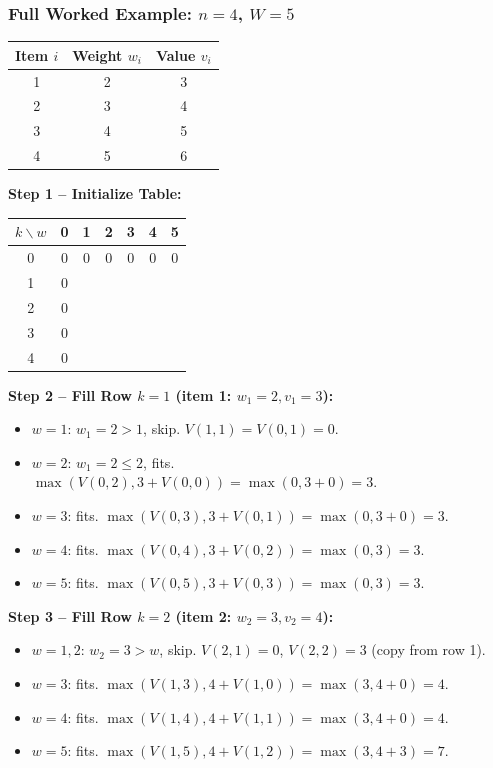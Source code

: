 \documentclass[12pt,portrait]{article}
\begin{document}
\subsubsection{Full Worked Example: $n=4$, $W=5$}

\begin{center}
\begin{tabular}{c|c|c}
\toprule
\textbf{Item $i$} & \textbf{Weight $w_i$} & \textbf{Value $v_i$} \\
\midrule
1 & 2 & 3 \\
2 & 3 & 4 \\
3 & 4 & 5 \\
4 & 5 & 6 \\
\bottomrule
\end{tabular}
\end{center}

\textbf{Step 1 -- Initialize Table:}

\begin{center}
\begin{tabular}{c|c|c|c|c|c|c}
\toprule
$k \backslash w$ & 0 & 1 & 2 & 3 & 4 & 5 \\
\midrule
0 & 0 & 0 & 0 & 0 & 0 & 0 \\
1 & 0 & & & & & \\
2 & 0 & & & & & \\
3 & 0 & & & & & \\
4 & 0 & & & & & \\
\bottomrule
\end{tabular}
\end{center}

\textbf{Step 2 -- Fill Row $k=1$ (item 1: $w_1=2, v_1=3$):}
\begin{itemize}[leftmargin=*]
    \item $w=1$: $w_1=2 > 1$, skip. $V(1,1) = V(0,1) = 0$.
    \item $w=2$: $w_1=2 \leq 2$, fits. $\max(V(0,2), 3+V(0,0)) = \max(0, 3+0) = 3$.
    \item $w=3$: fits. $\max(V(0,3), 3+V(0,1)) = \max(0, 3+0) = 3$.
    \item $w=4$: fits. $\max(V(0,4), 3+V(0,2)) = \max(0, 3) = 3$.
    \item $w=5$: fits. $\max(V(0,5), 3+V(0,3)) = \max(0, 3) = 3$.
\end{itemize}

\textbf{Step 3 -- Fill Row $k=2$ (item 2: $w_2=3, v_2=4$):}
\begin{itemize}[leftmargin=*]
    \item $w=1,2$: $w_2=3 > w$, skip. $V(2,1)=0$, $V(2,2)=3$ (copy from row 1).
    \item $w=3$: fits. $\max(V(1,3), 4+V(1,0)) = \max(3, 4+0) = 4$.
    \item $w=4$: fits. $\max(V(1,4), 4+V(1,1)) = \max(3, 4+0) = 4$.
    \item $w=5$: fits. $\max(V(1,5), 4+V(1,2)) = \max(3, 4+3) = 7$.
\end{itemize}
\end{document}
